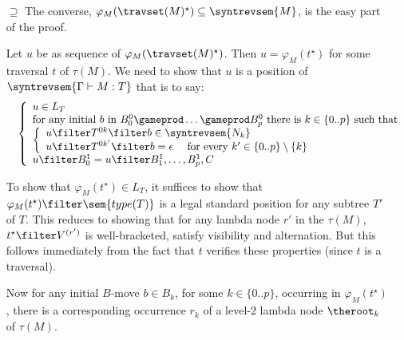 \begin{itemize}[$\bullet$]
\begin{enumerate}
\begin{itemize}
    \end{itemize}

\item[$\supseteq$]
  The converse, $\varphi_{M}( \travset(M)^\star) \subseteq \syntrevsem{M}$, is the easy part of the proof.

  Let $u$ be as sequence of $\varphi_{M}( \travset(M)^\star)$. Then
  $u = \varphi_{M}(t^\star)$ for some traversal $t$ of $\tau(M)$. We need to show that
  $u$ is a position of $\syntrevsem{\Gamma \vdash M : T}$ that is to say:
    \begin{eqnarray*}
    && \left\{
    \begin{array}{ll}
        u \in L_T \\
        \hbox{for any initial $b$ in $B_0^0 \gameprod \ldots \gameprod B_p^0$ there is $k \in \{0..p\}$ such that } \\
        \left\{\begin{array}{ll}
            u \filter T^{0k} \filter b  \in \syntrevsem{N_k} \\
            u \filter T^{0k'} \filter b  = \epsilon \quad \mbox{ for every } k'\in \{0..p\}\setminus\{k\}
        \end{array}
        \right. \\
        u \filter B^1_0 = u \filter B^1_1, \ldots, B^1_p, C
    \end{array}
    \right.
    \end{eqnarray*}

    To show that $\varphi_{M}(t^\star) \in L_T$, it suffices to show that $\varphi_{M}(t^\star) \filter \sem{type(T)}$ is a legal
    standard position for any subtree $T'$ of $T$. This reduces to showing that for any lambda node $r'$ in the $\tau(M)$,
    $t^\star \filter V^{(r')}$ is well-bracketed, satisfy visibility and alternation. But this follows immediately from the fact that $t$ verifies these properties (since $t$ is a traversal).

    Now for any initial $B$-move $b \in B_k$, for some $k\in\{0..p\}$, occurring in $\varphi_{M}(t^\star)$, there is a corresponding occurrence $r_k$
    of a level-$2$ lambda node $\theroot_k$ of $\tau(M)$.


\end{enumerate}
\end{itemize}
